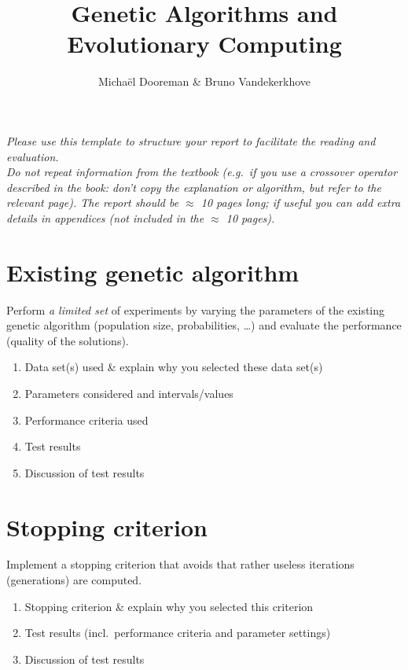 \documentclass[a4paper,11pt]{article}
\title{Genetic Algorithms and Evolutionary Computing}
\date{}
\author{Micha\"el Dooreman \& Bruno Vandekerkhove}
\begin{document}
\maketitle

\noindent
\emph{Please use this template to structure your report to facilitate the reading and evaluation.\\
Do not repeat information from the textbook (e.g.\ if you use a crossover operator described in the book: don't copy the explanation or algorithm, but refer to the relevant page).
The report should be $\approx$ 10 pages long; if useful you can add extra details in appendices (not included in the $\approx$ 10 pages).}
\section{Existing genetic algorithm}

Perform \emph{a limited set} of experiments by varying the parameters of the existing genetic algorithm (population size, probabilities, \ldots) and evaluate the performance (quality of the solutions).
\begin{enumerate}

\item Data set(s) used  \& explain why you selected these data set(s)
\item Parameters considered and intervals/values
\item  Performance criteria used
\item Test results 
\item Discussion of test results

\end{enumerate}

\section{Stopping criterion}
Implement a stopping criterion that avoids that rather useless iterations (generations) are computed.
\begin{enumerate}
\item	 Stopping criterion \& explain why you selected this criterion
\item Test results (incl.\ performance criteria and parameter settings)
\item Discussion of test results

\end{enumerate}
\end{document}
